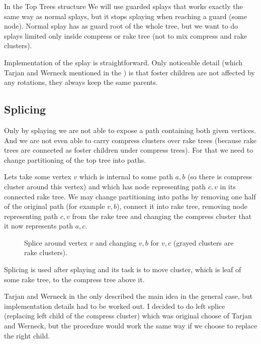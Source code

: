 In the Top Trees structure We will use {\I guarded splays} that works exactly
the same way as normal splays, but it stops splaying when reaching a guard (some
node). Normal splay has as guard root of the whole tree, but we want to do
splays limited only inside compress or rake tree (not to mix compress and
rake clusters).

Implementation of the splay is straightforward. Only noticeable detail (which
Tarjan and Werneck mentioned in the \cite{SelfAdjustingTT}) is that foster
children are not affected by any rotations, they always keep the same parents.

\subsection{Splicing}

Only by splaying we are not able to expose a path containing both given
vertices. And we are not even able to carry compress clusters over rake trees
(because rake trees are connected as foster children under compress trees). For
that we need to change partitioning of the top tree into paths.

Lets take some vertex $v$ which is internal to some path $a,b$ (so there is
compress cluster around this vertex) and which has node representing path $c,v$
in its connected rake tree. We may change partitioning into paths by removing
one half of the original path (for example $v,b$), connect it into rake tree,
removing node representing path $c,v$ from the rake tree and changing the
compress cluster that it now represents path $a,c$.

\begin{figure}[h]
\centering
{}
\caption[Splice around vertex $v$]
{Splice around vertex $v$ and changing $v,b$ for $v,c$ (grayed clusters are rake
clusters).}
\end{figure}

Splicing is used after splaying and its task is to move cluster, which is leaf
of some rake tree, to the compress tree above it.

Tarjan and Werneck in the \cite{SelfAdjustingTT} only described the main idea in
the general case, but implementation details had to be worked out. I decided
to do {\I left splice} (replacing left child of the compress cluster) which was
original choose of Tarjan and Werneck, but the procedure would work the same
way if we choose to replace the right child.

